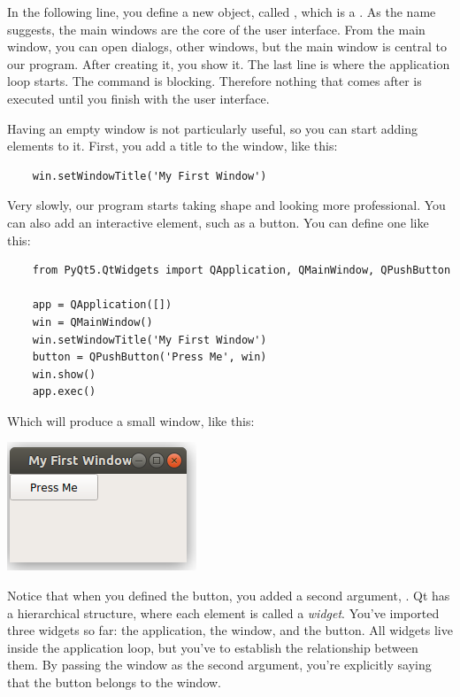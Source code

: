 In the following line, you define a new object, called , which is a . As the name suggests, the main windows are the core of the user interface. From the main window, you can open dialogs, other windows, but the main window is central to our program. After creating it, you show it. The last line is where the application loop starts. The  command is blocking. Therefore nothing that comes after is executed until you finish with the user interface.


Having an empty window is not particularly useful, so you can start adding elements to it. First, you add a title to the window, like this:

\begin{verbatim}
    win.setWindowTitle('My First Window')
\end{verbatim}

Very slowly, our program starts taking shape and looking more professional. You can also add an interactive element, such as a button. You can define one like this:

\begin{verbatim}
    from PyQt5.QtWidgets import QApplication, QMainWindow, QPushButton

    app = QApplication([])
    win = QMainWindow()
    win.setWindowTitle('My First Window')
    button = QPushButton('Press Me', win)
    win.show()
    app.exec()
\end{verbatim}

Which will produce a small window, like this:

\begin{center}
    \includegraphics[width=.3\textwidth]{images/Chapter_08/02_simple_window_and_button.png}
\end{center}

Notice that when you defined the button, you added a second argument, . Qt has a hierarchical structure, where each element is called a \emph{widget}. You've imported three widgets so far: the application, the window, and the button. All widgets live inside the application loop, but you've to establish the relationship between them. By passing the window as the second argument, you're explicitly saying that the button belongs to the window.

